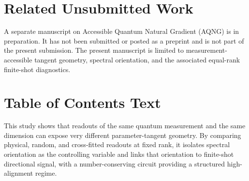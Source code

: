 \section*{Related Unsubmitted Work}
A separate manuscript on Accessible Quantum Natural Gradient (AQNG) is in preparation. It has not been submitted or posted as a preprint and is not part of the present submission. The present manuscript is limited to measurement-accessible tangent geometry, spectral orientation, and the associated equal-rank finite-shot diagnostics.

\section*{Table of Contents Text}
This study shows that readouts of the same quantum measurement and the same dimension can expose very different parameter-tangent geometry. By comparing physical, random, and cross-fitted readouts at fixed rank, it isolates spectral orientation as the controlling variable and links that orientation to finite-shot directional signal, with a number-conserving circuit providing a structured high-alignment regime.

